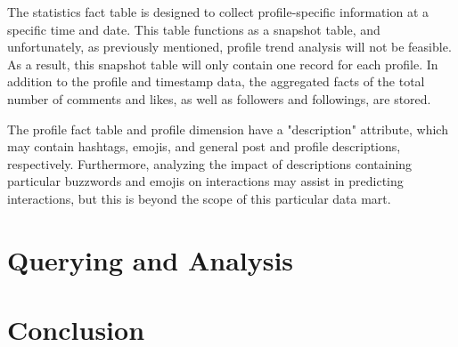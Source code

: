 \documentclass[conference]{IEEEtran}
\begin{document}
The statistics fact table is designed to collect profile-specific information at a specific time and date. This table functions as a snapshot table, and unfortunately, as previously mentioned, profile trend analysis will not be feasible. As a result, this snapshot table will only contain one record for each profile. In addition to the profile and timestamp data, the aggregated facts of the total number of comments and likes, as well as followers and followings, are stored.

The profile fact table and profile dimension have a "description" attribute, which may contain hashtags, emojis, and general post and profile descriptions, respectively. Furthermore, analyzing the impact of descriptions containing particular buzzwords and emojis on interactions may assist in predicting interactions, but this is beyond the scope of this particular data mart.

\section{Querying and Analysis}

\section{Conclusion}




\end{document}
